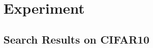     
\section{Experiment}









\subsection{Search Results on CIFAR10}
\label{sec:experiment_cifar10_search}


